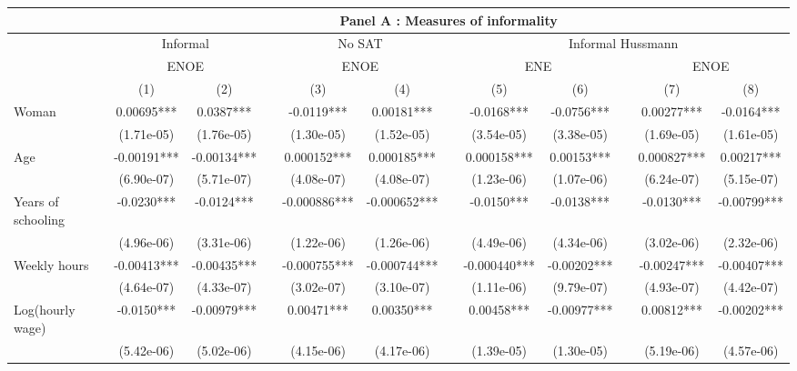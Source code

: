 \begin{tabular}{lccccccccccc}
\toprule
      & \multicolumn{11}{c}{Panel A : Measures of informality} \\
\midrule
\midrule
      & \multicolumn{2}{c}{Informal} &       & \multicolumn{2}{c}{No SAT} &       & \multicolumn{5}{c}{Informal Hussmann} \\
\cmidrule{2-3}\cmidrule{5-6}\cmidrule{8-12}      & \multicolumn{2}{c}{ENOE} &       & \multicolumn{2}{c}{ENOE} &       & \multicolumn{2}{c}{ENE} &       & \multicolumn{2}{c}{ENOE} \\
\cmidrule{2-3}\cmidrule{5-6}\cmidrule{8-9}\cmidrule{11-12}      & (1)   & (2)   &       & (3)   & (4)   &       & (5)   & (6)   &       & (7)   & (8) \\
\midrule
\midrule
Woman & 0.00695*** & 0.0387*** &       & -0.0119*** & 0.00181*** &       & -0.0168*** & -0.0756*** &       & 0.00277*** & -0.0164*** \\
      & (1.71e-05) & (1.76e-05) &       & (1.30e-05) & (1.52e-05) &       & (3.54e-05) & (3.38e-05) &       & (1.69e-05) & (1.61e-05) \\
Age   & -0.00191*** & -0.00134*** &       & 0.000152*** & 0.000185*** &       & 0.000158*** & 0.00153*** &       & 0.000827*** & 0.00217*** \\
      & (6.90e-07) & (5.71e-07) &       & (4.08e-07) & (4.08e-07) &       & (1.23e-06) & (1.07e-06) &       & (6.24e-07) & (5.15e-07) \\
Years of schooling & -0.0230*** & -0.0124*** &       & -0.000886*** & -0.000652*** &       & -0.0150*** & -0.0138*** &       & -0.0130*** & -0.00799*** \\
      & (4.96e-06) & (3.31e-06) &       & (1.22e-06) & (1.26e-06) &       & (4.49e-06) & (4.34e-06) &       & (3.02e-06) & (2.32e-06) \\
Weekly hours & -0.00413*** & -0.00435*** &       & -0.000755*** & -0.000744*** &       & -0.000440*** & -0.00202*** &       & -0.00247*** & -0.00407*** \\
      & (4.64e-07) & (4.33e-07) &       & (3.02e-07) & (3.10e-07) &       & (1.11e-06) & (9.79e-07) &       & (4.93e-07) & (4.42e-07) \\
Log(hourly wage) & -0.0150*** & -0.00979*** &       & 0.00471*** & 0.00350*** &       & 0.00458*** & -0.00977*** &       & 0.00812*** & -0.00202*** \\
      & (5.42e-06) & (5.02e-06) &       & (4.15e-06) & (4.17e-06) &       & (1.39e-05) & (1.30e-05) &       & (5.19e-06) & (4.57e-06) \\

\end{tabular}
